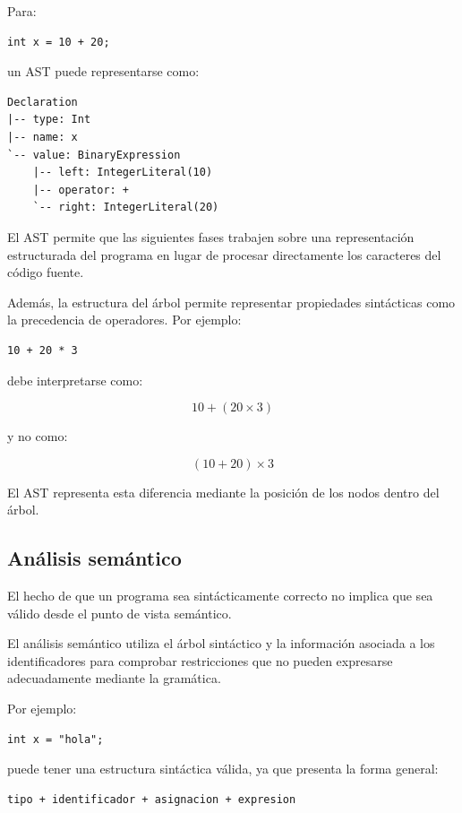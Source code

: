 \documentclass[11pt,a4paper]{article}
\begin{document}
Para:

\begin{lstlisting}
int x = 10 + 20;
\end{lstlisting}

un AST puede representarse como:

\begin{lstlisting}
Declaration
|-- type: Int
|-- name: x
`-- value: BinaryExpression
    |-- left: IntegerLiteral(10)
    |-- operator: +
    `-- right: IntegerLiteral(20)
\end{lstlisting}

El AST permite que las siguientes fases trabajen sobre una representación
estructurada del programa en lugar de procesar directamente los caracteres
del código fuente.

Además, la estructura del árbol permite representar propiedades sintácticas
como la precedencia de operadores. Por ejemplo:

\begin{lstlisting}
10 + 20 * 3
\end{lstlisting}

debe interpretarse como:

\[
10 + (20 \times 3)
\]

y no como:

\[
(10 + 20) \times 3
\]

El AST representa esta diferencia mediante la posición de los nodos dentro
del árbol.

\subsection{Análisis semántico}

El hecho de que un programa sea sintácticamente correcto no implica que sea
válido desde el punto de vista semántico.

El análisis semántico utiliza el árbol sintáctico y la información asociada
a los identificadores para comprobar restricciones que no pueden expresarse
adecuadamente mediante la gramática.

Por ejemplo:

\begin{lstlisting}
int x = "hola";
\end{lstlisting}

puede tener una estructura sintáctica válida, ya que presenta la forma general:

\begin{lstlisting}
tipo + identificador + asignacion + expresion
\end{lstlisting}
\end{document}
